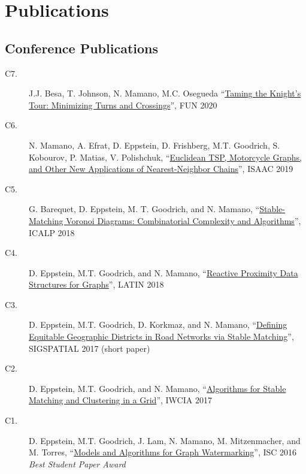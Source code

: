 \documentclass[letterpaper,10pt,oneside]{article}
\begin{document}
\section*{Publications}
\subsection*{Conference Publications}
\begin{description}
\item[C7.] J.J. Besa, T. Johnson, N. Mamano, M.C. Osegueda ``\href{https://arxiv.org/pdf/1904.02824.pdf}{Taming the Knight's Tour: Minimizing Turns and Crossings}'', FUN 2020	
\item[C6.] N. Mamano, A. Efrat, D. Eppstein, D. Frishberg, M.T. Goodrich, S. Kobourov, P. Matias, V. Polishchuk, ``\href{https://arxiv.org/pdf/1902.06875.pdf}{Euclidean TSP, Motorcycle Graphs, and Other New Applications of Nearest-Neighbor Chains}'', ISAAC 2019
\item[C5.] G. Barequet, D. Eppstein, M. T. Goodrich, and N. Mamano, ``\href{https://arxiv.org/pdf/1804.09411.pdf}{Stable-Matching Voronoi Diagrams: Combinatorial Complexity and Algorithms}'', ICALP 2018
\item[C4.] D. Eppstein, M.T. Goodrich, and N. Mamano, ``\href{https://arxiv.org/pdf/1803.04555.pdf}{Reactive Proximity Data Structures for Graphs}'', LATIN 2018
\item[C3.] D. Eppstein, M.T. Goodrich, D. Korkmaz, and N. Mamano, ``\href{https://arxiv.org/pdf/1706.09593.pdf}{Defining Equitable Geographic Districts in Road Networks via Stable Matching}'', SIGSPATIAL 2017 (short paper)
\item[C2.] D. Eppstein, M.T. Goodrich, and N. Mamano, ``\href{https://arxiv.org/pdf/1704.02303.pdf}{Algorithms for Stable Matching and Clustering in a Grid}'', IWCIA 2017
\item[C1.] D. Eppstein, M.T. Goodrich, J. Lam, N. Mamano, M. Mitzenmacher, and M. Torres, ``\href{https://arxiv.org/pdf/1605.09425.pdf}{Models and Algorithms for Graph Watermarking}'', ISC 2016 \textit{Best Student Paper Award}
\end{description}
\end{document}

